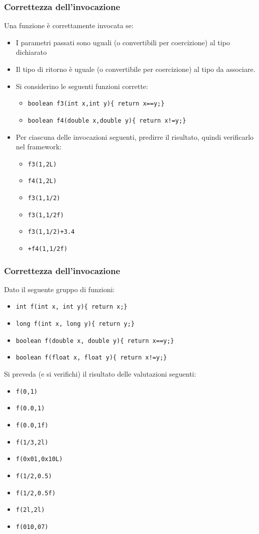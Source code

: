 \documentclass{beamer}
\begin{document}
\begin{frame}
\frametitle{Correttezza dell'invocazione}
Una funzione è correttamente invocata se:
\begin{itemize}
 \item I parametri passati sono uguali (o convertibili per coercizione) al tipo dichiarato
 \item Il tipo di ritorno è uguale (o convertibile per coercizione) al tipo da associare.
 \item Si considerino le seguenti funzioni corrette: 
\begin{itemize}
 \item \texttt{boolean f3(int x,int y)\{ return x==y;\}}
 \item \texttt{boolean f4(double x,double y)\{ return x!=y;\}}
\end{itemize}
 \item Per ciascuna delle invocazioni seguenti, predirre il risultato, quindi verificarlo nel framework:
\begin{itemize}
 \item \texttt{f3(1,2L)}
 \item \texttt{f4(1,2L)}
 \item \texttt{f3(1,1/2)}
 \item \texttt{f3(1,1/2f)}
 \item \texttt{f3(1,1/2)+3.4}
 \item \texttt{\textquotedbl{}\textquotedbl{}+f4(1,1/2f)}
\end{itemize}
\end{itemize}
\end{frame}

\begin{frame}
\frametitle{Correttezza dell'invocazione}
Dato il seguente gruppo di funzioni:
\begin{itemize}
 \item \texttt{int f(int x, int y)\{ return x;\}}
 \item \texttt{long f(int x, long y)\{ return y;\}}
 \item \texttt{boolean f(double x, double y)\{ return x==y;\}}
 \item \texttt{boolean f(float x, float y)\{ return x!=y;\}}
\end{itemize}
Si preveda (e si verifichi) il risultato delle valutazioni seguenti:
\begin{itemize}
 \item \texttt{f(0,1)}
 \item \texttt{f(0.0,1)}
 \item \texttt{f(0.0,1f)}
 \item \texttt{f(1/3,2l)}
 \item \texttt{f(0x01,0x10L)}
 \item \texttt{f(1/2,0.5)}
 \item \texttt{f(1/2,0.5f)}
 \item \texttt{f(2l,2l)}
 \item \texttt{f(010,07)}
\end{itemize}
\end{frame}
\end{document}
